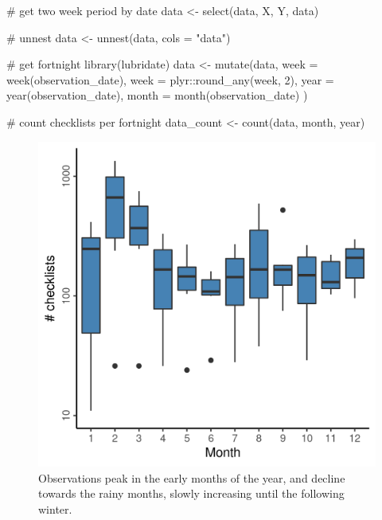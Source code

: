 \documentclass[
]{article}
\newenvironment{Shaded}{}{}
\newcommand{\CommentTok}[1]{\textcolor[rgb]{0.00,0.50,0.00}{#1}}
\newcommand{\DataTypeTok}[1]{#1}
\newcommand{\DecValTok}[1]{#1}
\newcommand{\KeywordTok}[1]{\textcolor[rgb]{0.00,0.00,1.00}{#1}}
\newcommand{\NormalTok}[1]{#1}
\newcommand{\OperatorTok}[1]{#1}
\newcommand{\StringTok}[1]{\textcolor[rgb]{0.00,0.50,0.50}{#1}}
\begin{document}
\begin{Shaded}
\begin{Highlighting}[]
\CommentTok{# get two week period by date}
\NormalTok{data <-}\StringTok{ }\KeywordTok{select}\NormalTok{(data, X, Y, data)}

\CommentTok{# unnest}
\NormalTok{data <-}\StringTok{ }\KeywordTok{unnest}\NormalTok{(data, }\DataTypeTok{cols =} \StringTok{"data"}\NormalTok{)}

\CommentTok{# get fortnight}
\KeywordTok{library}\NormalTok{(lubridate)}
\NormalTok{data <-}\StringTok{ }\KeywordTok{mutate}\NormalTok{(data,}
  \DataTypeTok{week =} \KeywordTok{week}\NormalTok{(observation_date),}
  \DataTypeTok{week =}\NormalTok{ plyr}\OperatorTok{::}\KeywordTok{round_any}\NormalTok{(week, }\DecValTok{2}\NormalTok{),}
  \DataTypeTok{year =} \KeywordTok{year}\NormalTok{(observation_date),}
  \DataTypeTok{month =} \KeywordTok{month}\NormalTok{(observation_date)}
\NormalTok{)}

\CommentTok{# count checklists per fortnight}
\NormalTok{data_count <-}\StringTok{ }\KeywordTok{count}\NormalTok{(data, month, year)}
\end{Highlighting}
\end{Shaded}

\begin{figure}
\centering
\includegraphics{figs/fig_chk_per_month.png}
\caption{Observations peak in the early months of the year, and decline towards the rainy months, slowly increasing until the following winter.}
\end{figure}
\end{document}

